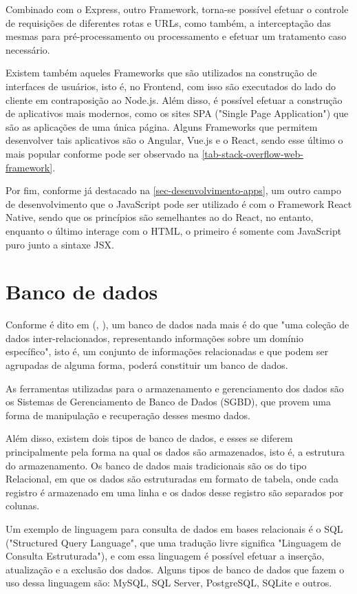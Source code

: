 Combinado com o Express, outro Framework, torna-se possível efetuar o controle de requisições de diferentes rotas e URLs, como também, a interceptação das mesmas para pré-processamento ou processamento e efetuar um tratamento caso necessário.

Existem também aqueles Frameworks que são utilizados na construção de interfaces de usuários, isto é, no Frontend, com isso são executados do lado do cliente em contraposição ao Node.js. Além disso, é possível efetuar a construção de aplicativos mais modernos, como os sites SPA ("Single Page Application") que são as aplicações de uma única página. Alguns Frameworks que permitem desenvolver tais aplicativos são o Angular, Vue.js e o React, sendo esse último o mais popular conforme pode ser observado na \autoref{tab-stack-overflow-web-framework}.

Por fim, conforme já destacado na \autoref{sec-desenvolvimento-apps}, um outro campo de desenvolvimento que o JavaScript pode ser utilizado é com o Framework React Native, sendo que os princípios são semelhantes ao do React, no entanto, enquanto o último interage com o HTML, o primeiro é somente com JavaScript puro junto a sintaxe JSX.

\section{Banco de dados}

Conforme é dito em (\citeauthor{silberschatz2016sistema}, \citeyear{silberschatz2016sistema}), um banco de dados nada mais é do que "uma coleção de dados inter-relacionados, representando informações sobre um domínio específico", isto é, um conjunto de informações relacionadas e que podem ser agrupadas de alguma forma, poderá constituir um banco de dados.

As ferramentas utilizadas para o armazenamento e gerenciamento dos dados são os Sistemas de Gerenciamento de Banco de Dados (SGBD), que provem uma forma de manipulação e recuperação desses mesmo dados.

Além disso, existem dois tipos de banco de dados, e esses se diferem principalmente pela forma na qual os dados são armazenados, isto é, a estrutura do armazenamento. Os banco de dados mais tradicionais são os do tipo Relacional, em que os dados são estruturadas em formato de tabela, onde cada registro é armazenado em uma linha e os dados desse registro são separados por colunas.

Um exemplo de linguagem para consulta de dados em bases relacionais é o SQL ("Structured Query Language", que uma tradução livre significa "Linguagem de Consulta Estruturada"), e com essa linguagem é possível efetuar a inserção, atualização e a exclusão dos dados. Alguns tipos de banco de dados que fazem o uso dessa linguagem são: MySQL, SQL Server, PostgreSQL, SQLite e outros.

